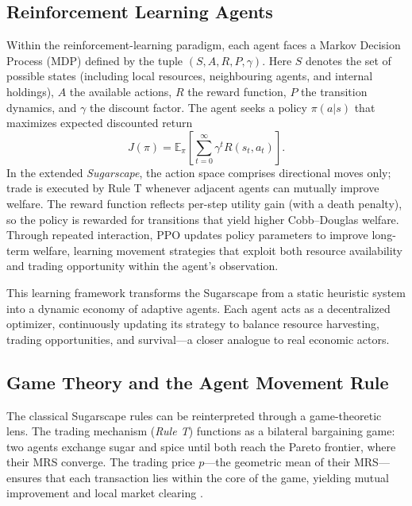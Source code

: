 \documentclass[pdflatex,sn-mathphys-num]{sn-jnl}%
\theoremstyle{thmstyleone}%
\theoremstyle{thmstyletwo}%
\theoremstyle{thmstylethree}%
\begin{document}

\subsection{Reinforcement Learning Agents}
Within the reinforcement-learning paradigm, each agent faces a Markov Decision Process (MDP) defined by the tuple \((S,A,R,P,\gamma)\).  
Here \(S\) denotes the set of possible states (including local resources, neighbouring agents, and internal holdings), \(A\) the available actions, \(R\) the reward function, \(P\) the transition dynamics, and \(\gamma\) the discount factor.  
The agent seeks a policy \(\pi(a|s)\) that maximizes expected discounted return
\[
J(\pi)=\mathbb{E}_{\pi}\!\left[\sum_{t=0}^{\infty}\gamma^{t}R(s_t,a_t)\right].
\]
In the extended \textit{Sugarscape}, the action space comprises directional moves only; trade is executed by Rule T whenever adjacent agents can mutually improve welfare.  
The reward function reflects per-step utility gain (with a death penalty), so the policy is rewarded for transitions that yield higher Cobb--Douglas welfare.  
Through repeated interaction, PPO updates policy parameters to improve long-term welfare, learning movement strategies that exploit both resource availability and trading opportunity within the agent's observation.

This learning framework transforms the Sugarscape from a static heuristic system into a dynamic economy of adaptive agents.  
Each agent acts as a decentralized optimizer, continuously updating its strategy to balance resource harvesting, trading opportunities, and survival---a closer analogue to real economic actors.


\subsection{Game Theory and the Agent Movement Rule}
The classical Sugarscape rules can be reinterpreted through a game-theoretic lens.  
The trading mechanism (\textit{Rule T}) functions as a bilateral bargaining game: two agents exchange sugar and spice until both reach the Pareto frontier, where their MRS converge.  
The trading price \(p\)---the geometric mean of their MRS---ensures that each transaction lies within the core of the game, yielding mutual improvement and local market clearing \citep{EpsteinAxtell1996}.
\end{document}
